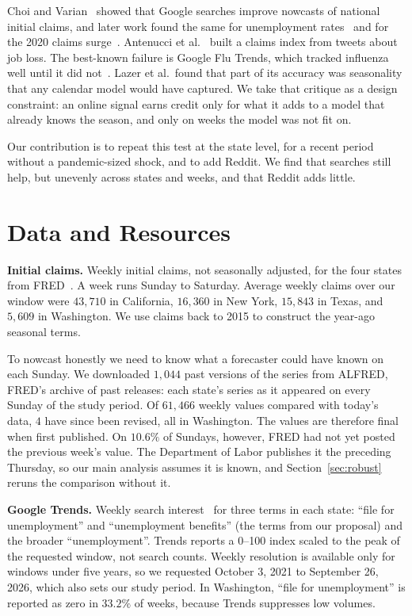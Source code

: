 \documentclass[sigconf,nonacm]{acmart}
\begin{document}
Choi and Varian~\cite{choi2012predicting} showed that Google searches improve nowcasts of
national initial claims, and later work found the same for unemployment
rates~\cite{askitas2009google,damuri2017predictive} and for the 2020 claims
surge~\cite{goldsmith2020predicting}. Antenucci et al.~\cite{antenucci2014using} built a
claims index from tweets about job loss. The best-known failure is Google Flu Trends, which
tracked influenza well until it did not~\cite{ginsberg2009detecting,lazer2014parable}.
Lazer et al.\ found that part of its accuracy was seasonality that any calendar model would
have captured. We take that critique as a design constraint: an online signal earns credit
only for what it adds to a model that already knows the season, and only on weeks the model
was not fit on.

Our contribution is to repeat this test at the state level, for a recent period without a
pandemic-sized shock, and to add Reddit. We find that searches still help, but unevenly
across states and weeks, and that Reddit adds little.

\section{Data and Resources}
\label{sec:data}

\textbf{Initial claims.} Weekly initial claims, not seasonally adjusted, for the four states
from FRED~\cite{fredclaims}. A week runs Sunday to Saturday. Average weekly claims over our
window were $43{,}710$ in California, $16{,}360$ in New York, $15{,}843$ in Texas, and
$5{,}609$ in Washington. We use claims back to 2015 to construct the year-ago seasonal terms.

To nowcast honestly we need to know what a forecaster could have known on each Sunday. We
downloaded $1{,}044$ past versions of the series from ALFRED, FRED's archive of past
releases: each state's series as it appeared on every Sunday of the study period. Of $61{,}466$ weekly values compared with today's data, $4$ have
since been revised, all in Washington. The values are therefore final when first published.
On $10.6\%$ of Sundays, however, FRED had not yet posted the previous week's value. The
Department of Labor publishes it the preceding Thursday, so our main analysis assumes it is
known, and Section~\ref{sec:robust} reruns the comparison without it.

\textbf{Google Trends.} Weekly search interest~\cite{googletrends} for three terms in each
state: ``file for
unemployment'' and ``unemployment benefits'' (the terms from our proposal) and the broader
``unemployment''. Trends reports a 0--100 index scaled to the peak of the requested window,
not search counts. Weekly resolution is available only for windows under five years, so we
requested October 3, 2021 to September 26, 2026, which also sets our study period. In
Washington, ``file for unemployment'' is reported as zero in $33.2\%$ of weeks, because
Trends suppresses low volumes.
\end{document}
